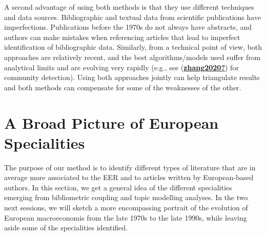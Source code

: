 \documentclass[]{elsarticle} %
\begin{document}
A second advantage of using both methods is that they use different
techniques and data sources. Bibliographic and textual data from
scientific publications have imperfections. Publications before the
1970s do not always have abstracts, and authors can make mistakes when
referencing articles that lead to imperfect identification of
bibliographic data. Similarly, from a technical point of view, both
approaches are relatively recent, and the best algorithms/models used
suffer from analytical limits and are evolving very rapidly (e.g., see
(\protect\hyperlink{ref-zhang2020}{\textbf{zhang2020?}}) for community
detection). Using both approaches jointly can help triangulate results
and both methods can compensate for some of the weaknesses of the other.

\hypertarget{european-specialities}{%
\section{A Broad Picture of European
Specialities}\label{european-specialities}}

The purpose of our method is to identify different types of literature
that are in average more associated to the EER and to articles written
by European-based authors. In this section, we get a general idea of the
different specialities emerging from bibliometric coupling and topic
modelling analyses. In the two next sessions, we will sketch a more
encompassing portrait of the evolution of European macroeconomis from
the late 1970s to the late 1990s, while leaving aside some of the
specialities identified.
\end{document}
